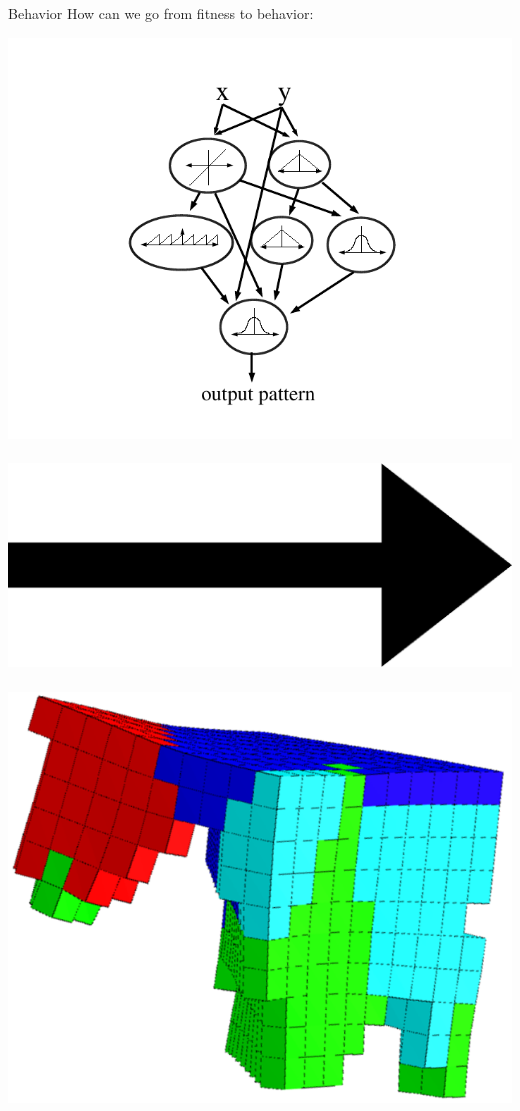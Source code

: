 \documentclass{beamer}
\begin{document}
\begin{frame}{Behavior}
How can we go from fitness to behavior:\\
\vspace{0.2cm}
\begin{center}
\includegraphics[height=0.15\textheight]{figures/cppnNetwork.png}\	
\includegraphics[height=0.05\textheight]{figures/Arrow_east.eps}\	
\includegraphics[height=0.15\textheight]{figures/unshacklingEvolutionFigure2.png}\	

\end{center}
\end{frame}
\end{document}
